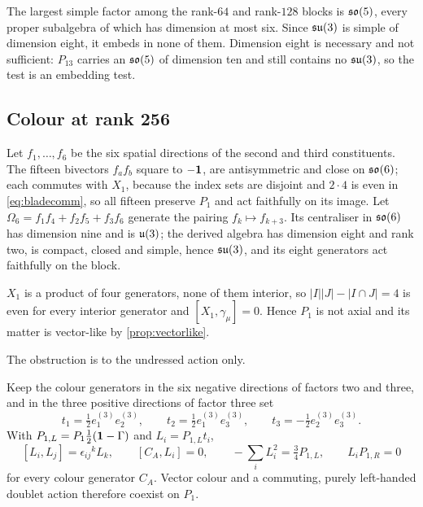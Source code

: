 \begin{corollary}
\label{cor:nocolour}
The largest simple factor among the rank-$64$ and rank-$128$ blocks is $\mathfrak{so}(5)$, every proper subalgebra of which has dimension at most
six. Since $\mathfrak{su}(3)$ is simple of dimension eight, it embeds in none of them. Dimension eight is necessary and not sufficient: $P_{13}$
carries an $\mathfrak{so}(5)$ of dimension ten and still contains no $\mathfrak{su}(3)$, so the test is an embedding test.
\end{corollary}

\subsection{Colour at rank 256}

\begin{theorem}[Colour on $P_1$]
\label{thm:su3}
Let $f_1,\dots,f_6$ be the six spatial directions of the second and third constituents. The fifteen bivectors $f_af_b$ square to
$-\mathbf 1$, are antisymmetric and close on $\mathfrak{so}(6)$; each commutes with $X_1$, because the index sets are disjoint and $2\cdot4$ is even in
\eqref{eq:bladecomm}, so all fifteen preserve $P_1$ and act faithfully on its image. Let $\Omega_6=f_1f_4+f_2f_5+f_3f_6$ generate the pairing
$f_k\mapsto f_{k+3}$. Its centraliser in $\mathfrak{so}(6)$ has dimension nine and is $\mathfrak{u}(3)$; the derived algebra has dimension eight and rank two, is
compact, closed and simple, hence $\mathfrak{su}(3)$, and its eight generators act faithfully on the block.
\end{theorem}

\begin{theorem}
\label{thm:p1}
$X_1$ is a product of four generators, none of them interior, so $|I||J|-|I\cap J|=4$ is even for every interior generator and
$[X_1,\gamma_\mu]=0$. Hence $P_1$ is not axial and its matter is vector-like by \cref{prop:vectorlike}.
\end{theorem}

The obstruction is to the undressed action only.

\begin{theorem}
\label{thm:p1chiral}
Keep the colour generators in the six negative directions of factors two and three, and in the three positive directions of factor
three set
\[
t_1=\tfrac12e^{(3)}_1e^{(3)}_2,\qquad t_2=\tfrac12e^{(3)}_1e^{(3)}_3,\qquad t_3=-\tfrac12e^{(3)}_2e^{(3)}_3 .
\]
With $P_{1,L}=P_1\tfrac12(\mathbf 1-\Gamma)$ and $L_i=P_{1,L}t_i$,
\[
[L_i,L_j]=\epsilon_{ij}{}^kL_k,\qquad [C_A,L_i]=0,\qquad -\sum_iL_i^2=\tfrac34P_{1,L},\qquad L_iP_{1,R}=0
\]
for every colour generator $C_A$. Vector colour and a commuting, purely left-handed doublet action therefore coexist on $P_1$.
\end{theorem}

